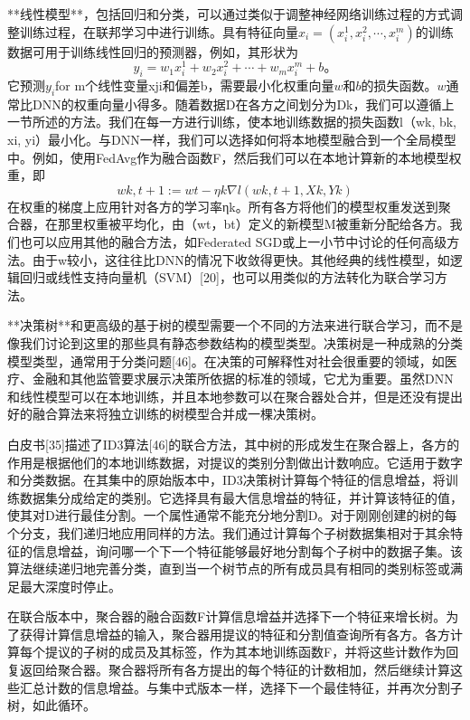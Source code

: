 **线性模型**，包括回归和分类，可以通过类似于调整神经网络训练过程的方式调整训练过程，在联邦学习中进行训练。具有特征向量$x_{i}=(x^{1}_{i}, x^{2}_{i}, \cdots, x^{m}_{i})$的训练数据可用于训练线性回归的预测器，例如，其形状为
$$
y_{i} = w_{1}x^{1}_{i} + w_{2}x^{2}_{i} + \cdots + w_{m}x^{m}_{i} + b。
$$
它预测$y_{i}$for m个线性变量xji和偏差b，需要最小化权重向量$w$和$b$的损失函数。$w$通常比DNN的权重向量小得多。随着数据D在各方之间划分为Dk，我们可以遵循上一节所述的方法。我们在每一方进行训练，使本地训练数据的损失函数l（wk, bk, xi, yi）最小化。与DNN一样，我们可以选择如何将本地模型融合到一个全局模型中。例如，使用FedAvg作为融合函数F，然后我们可以在本地计算新的本地模型权重，即
$$
wk,t+1:= wt− ηk\nabla l(wk,t+1, Xk, Yk)
$$
在权重的梯度上应用针对各方的学习率ηk。所有各方将他们的模型权重发送到聚合器，在那里权重被平均化，由（wt，bt）定义的新模型M被重新分配给各方。我们也可以应用其他的融合方法，如Federated SGD或上一小节中讨论的任何高级方法。由于w较小，这往往比DNN的情况下收敛得更快。其他经典的线性模型，如逻辑回归或线性支持向量机（SVM）[20]，也可以用类似的方法转化为联合学习方法。

**决策树**和更高级的基于树的模型需要一个不同的方法来进行联合学习，而不是像我们讨论到这里的那些具有静态参数结构的模型类型。决策树是一种成熟的分类模型类型，通常用于分类问题[46]。在决策的可解释性对社会很重要的领域，如医疗、金融和其他监管要求展示决策所依据的标准的领域，它尤为重要。虽然DNN和线性模型可以在本地训练，并且本地参数可以在聚合器处合并，但是还没有提出好的融合算法来将独立训练的树模型合并成一棵决策树。

白皮书[35]描述了ID3算法[46]的联合方法，其中树的形成发生在聚合器上，各方的作用是根据他们的本地训练数据，对提议的类别分割做出计数响应。它适用于数字和分类数据。在其集中的原始版本中，ID3决策树计算每个特征的信息增益，将训练数据集分成给定的类别。它选择具有最大信息增益的特征，并计算该特征的值，使其对D进行最佳分割。一个属性通常不能充分地分割D。对于刚刚创建的树的每个分支，我们递归地应用同样的方法。我们通过计算每个子树数据集相对于其余特征的信息增益，询问哪一个下一个特征能够最好地分割每个子树中的数据子集。该算法继续递归地完善分类，直到当一个树节点的所有成员具有相同的类别标签或满足最大深度时停止。

在联合版本中，聚合器的融合函数F计算信息增益并选择下一个特征来增长树。为了获得计算信息增益的输入，聚合器用提议的特征和分割值查询所有各方。各方计算每个提议的子树的成员及其标签，作为其本地训练函数F，并将这些计数作为回复返回给聚合器。聚合器将所有各方提出的每个特征的计数相加，然后继续计算这些汇总计数的信息增益。与集中式版本一样，选择下一个最佳特征，并再次分割子树，如此循环。

